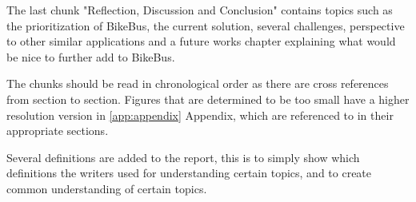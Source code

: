 The last chunk "Reflection, Discussion and Conclusion" contains topics such as the prioritization of BikeBus, the current solution, several challenges, perspective to other similar applications and a future works chapter explaining what would be nice to further add to BikeBus.   



The chunks should be read in chronological order as there are cross references from section to section. Figures that are determined to be too small have a higher resolution version in \ref{app:appendix} Appendix, which are referenced to in their appropriate sections. 

Several definitions are added to the report, this is to simply show which definitions the writers used for understanding certain topics, and to create common understanding of certain topics. 